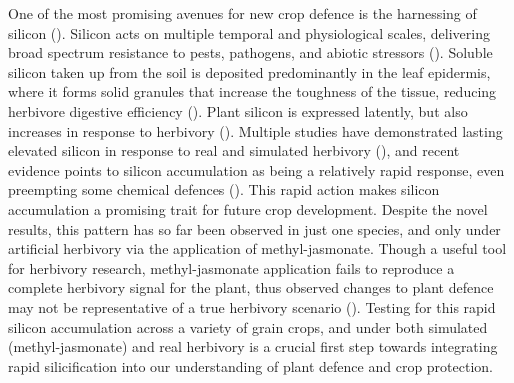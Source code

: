\documentclass[12pt, letterpaper, ]{article}
\begin{document}
One of the most promising avenues for new crop defence is the harnessing of silicon (\cite{reynolds_silicon_2016}). Silicon acts on multiple temporal and physiological scales, delivering broad spectrum resistance to pests, pathogens, and abiotic stressors (\cite{cooke_consistent_2016,coskun_controversies_2019}). Soluble silicon taken up from the soil is deposited predominantly in the leaf epidermis, where it forms solid granules that increase the toughness of the tissue, reducing herbivore digestive efficiency (\cite{cooke_is_2011}). Plant silicon is expressed latently, but also increases in response to herbivory (\cite{takahashi_possibility_1990, }). Multiple studies have demonstrated lasting elevated silicon in response to real and simulated herbivory (\cite{massey_are_2008,hartley_ecology_2016}), and recent evidence points to silicon accumulation as being a relatively rapid response, even preempting some chemical defences (\cite{waterman_short-term_2021}). This rapid action makes silicon accumulation a promising trait for future crop development. Despite the novel results, this pattern has so far been observed in just one species, and only under artificial herbivory via the application of methyl-jasmonate. Though a useful tool for herbivory research, methyl-jasmonate application fails to reproduce a complete herbivory signal for the plant, thus observed changes to plant defence may not be representative of a true herbivory scenario (\cite{strauss_direct_2002}). Testing for this rapid silicon accumulation across a variety of grain crops, and under both simulated (methyl-jasmonate) and real herbivory is a crucial first step towards integrating rapid silicification into our understanding of plant defence and crop protection.
\end{document}

